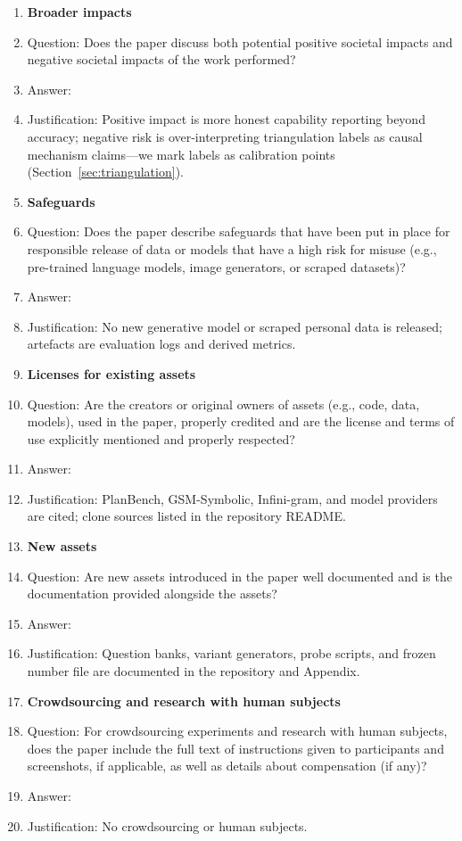 \begin{enumerate}
\item {\bf Broader impacts}
    \item[] Question: Does the paper discuss both potential positive societal impacts and negative societal impacts of the work performed?
    \item[] Answer: \answerYes{}
    \item[] Justification: Positive impact is more honest capability reporting beyond accuracy; negative risk is over-interpreting triangulation labels as causal mechanism claims---we mark labels as calibration points (Section~\ref{sec:triangulation}).

\item {\bf Safeguards}
    \item[] Question: Does the paper describe safeguards that have been put in place for responsible release of data or models that have a high risk for misuse (e.g., pre-trained language models, image generators, or scraped datasets)?
    \item[] Answer: \answerNA{}
    \item[] Justification: No new generative model or scraped personal data is released; artefacts are evaluation logs and derived metrics.

\item {\bf Licenses for existing assets}
    \item[] Question: Are the creators or original owners of assets (e.g., code, data, models), used in the paper, properly credited and are the license and terms of use explicitly mentioned and properly respected?
    \item[] Answer: \answerYes{}
    \item[] Justification: PlanBench, GSM-Symbolic, Infini-gram, and model providers are cited; clone sources listed in the repository README.

\item {\bf New assets}
    \item[] Question: Are new assets introduced in the paper well documented and is the documentation provided alongside the assets?
    \item[] Answer: \answerYes{}
    \item[] Justification: Question banks, variant generators, probe scripts, and frozen number file are documented in the repository and Appendix.

\item {\bf Crowdsourcing and research with human subjects}
    \item[] Question: For crowdsourcing experiments and research with human subjects, does the paper include the full text of instructions given to participants and screenshots, if applicable, as well as details about compensation (if any)?
    \item[] Answer: \answerNA{}
    \item[] Justification: No crowdsourcing or human subjects.


\end{enumerate}
